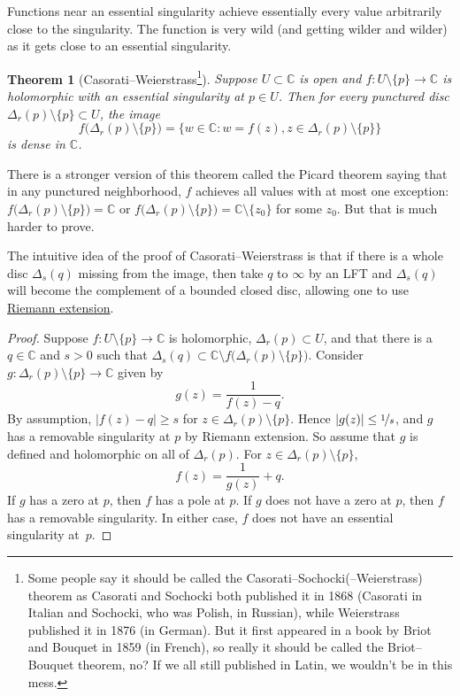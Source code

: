 \documentclass[12pt,openany]{book}
\newcommand{\sabs}[1]{\lvert {#1} \rvert}
\newcommand{\C}{{\mathbb{C}}}
\theoremstyle{plain}
\newtheorem{thm}{Theorem}[section]
\theoremstyle{remark}
\theoremstyle{definition}
\theoremstyle{exercise}
\theoremstyle{example}
\begin{document}
Functions near an essential singularity achieve essentially every value
arbitrarily close to the singularity.  The function is very wild (and
getting wilder and wilder) as it gets close to an essential singularity.

\begin{thm}[Casorati--Weierstrass\footnote{%
Some people say it should be called the Casorati--Sochocki(--Weierstrass) theorem as
Casorati and Sochocki both published it in 1868 (Casorati in Italian
and Sochocki, who was Polish, in Russian),
while Weierstrass published it in 1876 (in
German).  But it first appeared in a book by Briot and Bouquet in
1859 (in French), so really it should be called the Briot--Bouquet theorem,
no?  If we all still published in Latin, we wouldn't be in this
mess.}]\label{thm:casoratiweierstrass}
Suppose $U \subset \C$ is open and $f \colon U \setminus \{ p \} \to \C$ is
holomorphic with
an essential singularity at $p \in U$.  Then for every punctured disc
$\Delta_r(p) \setminus \{ p \} \subset U$, the image
\begin{equation*}
f\bigl(\Delta_r(p) \setminus \{ p \} \bigr)
=
\bigl\{ w \in \C : w = f(z), z \in \Delta_r(p) \setminus \{ p \} \bigr\}
\end{equation*}
is dense in $\C$.
\end{thm}

There is a stronger version
of this theorem called the Picard theorem saying that in any
punctured neighborhood, $f$ achieves all values with at most one exception:
$f\bigl(\Delta_r(p) \setminus \{ p \} \bigr) = \C$ or 
$f\bigl(\Delta_r(p) \setminus \{ p \} \bigr) = \C \setminus \{ z_0 \}$ for
some $z_0$.
But that is much harder to prove.

The intuitive idea of the proof of Casorati--Weierstrass is that if there
is a whole disc $\Delta_s(q)$ missing from the image, then take $q$ to
$\infty$ by an LFT and $\Delta_s(q)$ will become the complement of a bounded
closed disc, allowing one to use
\hyperref[thm:riemannext]{Riemann extension}.

\begin{proof}
Suppose $f \colon U \setminus \{ p \} \to \C$ is holomorphic,
$\Delta_r(p) \subset U$,
and that
there is a $q \in \C$ and $s > 0$ such that $\Delta_s(q) \subset \C
\setminus 
f\bigl(\Delta_r(p) \setminus \{ p \} \bigr)$.
Consider $g \colon \Delta_r(p) \setminus \{p\} \to \C$ given by
\begin{equation*}
g(z) = \frac{1}{f(z) - q} .
\end{equation*}
By assumption, $\sabs{f(z)-q} \geq s$ for $z \in \Delta_r(p) \setminus
\{p\}$.
Hence $\sabs{g(z)} \leq \nicefrac{1}{s}$, and $g$ has a removable
singularity at $p$ by Riemann extension.  So
assume that $g$ is defined and holomorphic on all of
$\Delta_r(p)$.  For $z \in \Delta_r(p) \setminus \{ p \}$,
\begin{equation*}
f(z) = \frac{1}{g(z)} + q .
\end{equation*}
If $g$ has a zero at $p$, then $f$ has a pole at $p$.  If $g$ does not
have a zero at $p$, then $f$ has a removable singularity.  In either case,
$f$ does not have an essential singularity at~$p$.
\end{proof}
\end{document}
